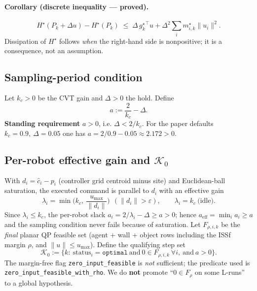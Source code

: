 \paragraph{Corollary (discrete inequality --- proved).}
\begin{equation}
H^\star(P_k+\Delta u)-H^\star(P_k)\;\le\;
\Delta\,{g_k^\star}^\top u+\Delta^2\sum_i m_{i,k}^\star\|u_i\|^2 .
\label{eq:discrete-ineq}
\end{equation}
Dissipation of $H^\star$ follows \emph{when} the right-hand side is nonpositive;
it is a consequence, not an assumption.

\subsection{Sampling-period condition}
Let $k_c>0$ be the CVT gain and $\Delta>0$ the hold. Define
\[
a:=\frac{2}{k_c}-\Delta .
\]
\textbf{Standing requirement} $a>0$, i.e. $\Delta<2/k_c$. For the paper defaults
$k_c=0.9,\ \Delta=0.05$ one has $a=2/0.9-0.05\approx 2.172>0$.

\subsection{Per-robot effective gain and $\mathcal{K}_0$}
With $d_i=\hat c_i-p_i$ (controller grid centroid minus site) and Euclidean-ball
saturation, the executed command is parallel to $d_i$ with an effective gain
\[
\lambda_i=\min\!\Big(k_c,\ \frac{u_{\max}}{\|d_i\|}\Big)\ \ (\|d_i\|>\varepsilon),
\qquad \lambda_i=k_c\ \text{(idle)} .
\]
Since $\lambda_i\le k_c$, the per-robot slack $a_i=2/\lambda_i-\Delta\ge a>0$;
hence $a_{\mathrm{eff}}=\min_i a_i\ge a$ and the sampling condition never fails
because of saturation. Let $F_{\rho,i,k}$ be the \emph{final} planar QP feasible
set (agent + wall + object rows including the ISSf margin $\rho$, and
$\|u\|\le u_{\max}$). Define the qualifying step set
\[
\mathcal{K}_0:=\{k:\ \mathrm{status}_i=\texttt{optimal}\ \text{and}\
0\in F_{\rho,i,k}\ \forall i,\ \text{and}\ a>0\}.
\]
The margin-free flag \texttt{zero\_input\_feasible} is \emph{not} sufficient;
the predicate used is \texttt{zero\_input\_feasible\_with\_rho}. We do
\textbf{not} promote ``$0\in F_\rho$ on some L-runs'' to a global hypothesis.

